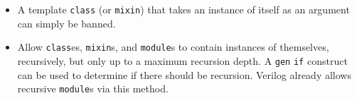 \documentclass{article}
\begin{document}
\begin{enumerate}
\begin{itemize}
\begin{itemize}
			\item A template \texttt{class} (or \texttt{mixin}) that takes
			an instance of itself as an argument can simply be banned.
			\item Allow \texttt{class}es, \texttt{mixin}s, and
			\texttt{module}s to contain instances of themselves,
			recursively, but only up to a maximum recursion depth.  A
			\texttt{gen} \texttt{if} construct can be used to determine if
			there should be recursion.  Verilog already allows recursive
			\texttt{module}s via this method.
			\end{itemize}
		\end{itemize}
	\end{enumerate}


\end{document}
